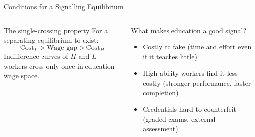 \documentclass[aspectratio=169, 12pt]{beamer}
\begin{document}
\begin{frame}{Conditions for a Signalling Equilibrium}
  \begin{columns}
      \begin{alertblock}{The single-crossing property}
        \small For a separating equilibrium to exist:
        \[\text{Cost}_L > \text{Wage gap} > \text{Cost}_H\]
        Indifference curves of $H$ and $L$ workers cross only once in education--wage space.
      \end{alertblock}
      \begin{block}{What makes education a good signal?}
        \small
        \begin{itemize}
          \item Costly to fake (time and effort even if it teaches little)
          \item High-ability workers find it less costly (stronger performance, faster completion)
          \item Credentials hard to counterfeit (graded exams, external assessment)
        \end{itemize}
      \end{block}
  \end{columns}
\end{frame}
\end{document}

